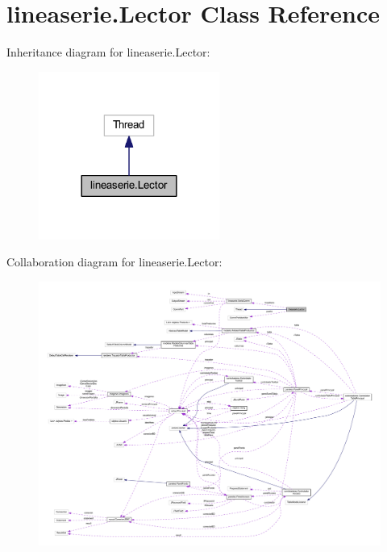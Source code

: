 \hypertarget{classlineaserie_1_1_lector}{}\section{lineaserie.\+Lector Class Reference}
\label{classlineaserie_1_1_lector}


Inheritance diagram for lineaserie.\+Lector\+:\nopagebreak
\begin{figure}[H]
\begin{center}
\leavevmode
\includegraphics[width=168pt]{classlineaserie_1_1_lector__inherit__graph}
\end{center}
\end{figure}


Collaboration diagram for lineaserie.\+Lector\+:\nopagebreak
\begin{figure}[H]
\begin{center}
\leavevmode
\includegraphics[width=350pt]{classlineaserie_1_1_lector__coll__graph}
\end{center}
\end{figure}
